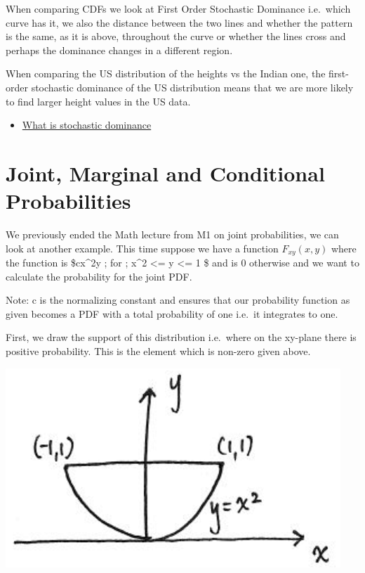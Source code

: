 \documentclass[]{book}
\providecommand{\tightlist}{%
  \setlength{\itemsep}{0pt}\setlength{\parskip}{0pt}}
\theoremstyle{definition}
\theoremstyle{definition}
\theoremstyle{definition}
\theoremstyle{remark}
\begin{document}
When comparing CDFs we look at First Order Stochastic Dominance
i.e.~which curve has it, we also the distance between the two lines and
whether the pattern is the same, as it is above, throughout the curve or
whether the lines cross and perhaps the dominance changes in a different
region.

When comparing the US distribution of the heights vs the Indian one, the
first-order stochastic dominance of the US distribution means that we
are more likely to find larger height values in the US data.

\begin{itemize}
\tightlist
\item
  \href{https://www.youtube.com/watch?v=6iE_5y4r2FI}{What is stochastic
  dominance}
\end{itemize}

\hypertarget{joint-marginal-and-conditional-probabilities}{\section{Joint,
Marginal and Conditional
Probabilities}\label{joint-marginal-and-conditional-probabilities}}

We previously ended the Math lecture from M1 on joint probabilities, we
can look at another example. This time suppose we have a function
\(F_{xy}(x,y)\) where the function is \$cx\^{}2y ; for ; x\^{}2
\textless{}= y \textless{}= 1 \$ and is 0 otherwise and we want to
calculate the probability for the joint PDF.

Note: c is the normalizing constant and ensures that our probability
function as given becomes a PDF with a total probability of one i.e.~it
integrates to one.

First, we draw the support of this distribution i.e.~where on the
xy-plane there is positive probability. This is the element which is
non-zero given above.

\includegraphics[width=1\linewidth]{images/jointsupport2D}
\end{document}
